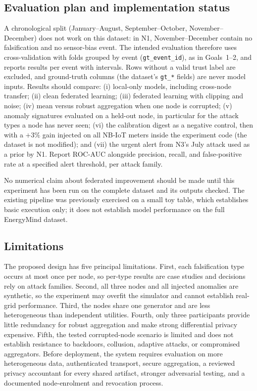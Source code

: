 \subsection{Evaluation plan and implementation status}
A chronological split (January--August, September--October, November--December) does not work on this dataset: in N1, November--December contain no falsification and no sensor-bias event. The intended evaluation therefore uses cross-validation with folds grouped by event (\texttt{gt\_event\_id}), as in Goals~1--2, and reports results per event with intervals. Rows without a valid trust label are excluded, and ground-truth columns (the dataset's \texttt{gt\_*} fields) are never model inputs. Results should compare: (i) local-only models, including cross-node transfer; (ii) clean federated learning; (iii) federated learning with clipping and noise; (iv) mean versus robust aggregation when one node is corrupted; (v) anomaly signatures evaluated on a held-out node, in particular for the attack types a node has never seen; (vi) the calibration digest as a negative control, then with a $+3\%$ gain injected on all NB-IoT meters inside the experiment code (the dataset is not modified); and (vii) the urgent alert from N3's July attack used as a prior by N1. Report ROC-AUC alongside precision, recall, and false-positive rate at a specified alert threshold, per attack family.

No numerical claim about federated improvement should be made until this experiment has been run on the complete dataset and its outputs checked. The existing pipeline was previously exercised on a small toy table, which establishes basic execution only; it does not establish model performance on the full EnergyMind dataset.

\subsection{Limitations}
The proposed design has five principal limitations. First, each falsification type occurs at most once per node, so per-type results are case studies and decisions rely on attack families. Second, all three nodes and all injected anomalies are synthetic, so the experiment may overfit the simulator and cannot establish real-grid performance. Third, the nodes share one generator and are less heterogeneous than independent utilities. Fourth, only three participants provide little redundancy for robust aggregation and make strong differential privacy expensive. Fifth, the tested corrupted-node scenario is limited and does not establish resistance to backdoors, collusion, adaptive attacks, or compromised aggregators. Before deployment, the system requires evaluation on more heterogeneous data, authenticated transport, secure aggregation, a reviewed privacy accountant for every shared artifact, stronger adversarial testing, and a documented node-enrolment and revocation process.
